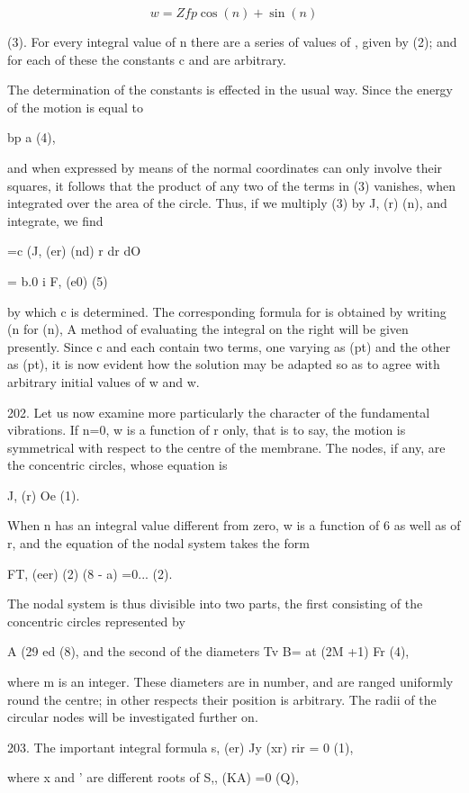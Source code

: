 \[w= Z fp \cos(n) + \sin(n)\]

(3). For every integral value of n there are a series of values of ,
given by (2); and for each of these the constants c and are arbitrary.

The determination of the constants is effected in the usual way. Since
the energy of the motion is equal to

bp a (4),

and when expressed by means of the normal coordinates can only involve
their squares, it follows that the product of any two of the terms in
(3) vanishes, when integrated over the area of the circle. Thus, if we
multiply (3) by J, (r) (n), and integrate, we find

=c (J, (er) (nd) r dr dO

= b.0 i F, (e0) (5)

by which c is determined. The corresponding formula for is obtained by
writing (n for (n), A method of evaluating the integral on the right
will be given presently. Since c and each contain two terms, one varying
as (pt) and the other as (pt), it is now evident how the solution may be
adapted so as to agree with arbitrary initial values of w and w.


202. Let us now examine more particularly the character of the
fundamental vibrations. If n=0, w is a function of r only, that is to
say, the motion is symmetrical with respect to the centre of the
membrane. The nodes, if any, are the concentric circles, whose equation
is

J, (r) Oe (1).

When n has an integral value different from zero, w is a function of 6
as well as of r, and the equation of the nodal system takes the form

FT, (eer) (2) (8 - a) =0... (2).

The nodal system is thus divisible into two parts, the first consisting
of the concentric circles represented by

A (29 ed (8), and the second of the diameters Tv B= at (2M +1) Fr (4),

where m is an integer. These diameters are in number, and are ranged
uniformly round the centre; in other respects their position is
arbitrary. The radii of the circular nodes will be investigated further
on.

203. The important integral formula s, (er) Jy (xr) rir = 0 (1),

where x and ' are different roots of S,, (KA) =0 (Q),

